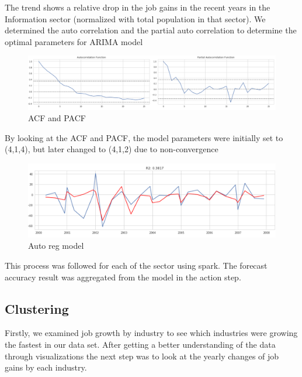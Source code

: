 \documentclass[11pt,letterpaper]{article}
\begin{document}
The trend shows a relative drop in the job gains in the recent years in the Information sector (normalized with total population in that sector). We determined the auto correlation and the partial auto correlation to determine the optimal parameters for ARIMA model

\begin{figure}[h]
	\includegraphics[width=\linewidth]{"./pictures/acf"}
	\caption{ACF and PACF}
    \label{fig:ACF}
\end{figure}

By looking at the ACF and PACF, the model parameters were initially set to (4,1,4), but later changed to (4,1,2) due to non-convergence

\begin{figure}[h]
	\includegraphics[width=\linewidth]{"./pictures/ARIMA"}
	\caption{Auto reg model}
    \label{fig:ACF}
\end{figure}

This process was followed for each of the sector using spark. The forecast accuracy result was aggregated from the model in the action step.


\subsection{Clustering}
\label{ssec:clusterResult}

Firstly, we examined job growth by industry to see which industries were growing the fastest in our data set. After getting a better understanding of the data through visualizations the next step was to look at the yearly changes of job gains by each industry. 
\end{document}
